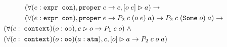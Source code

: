 \begin{figure}
\begin{align*}
& \qquad\quad (\forall (e : \sltm{expr con}), \hybridtm{proper} \; e \rightarrow \bchsl[c]{o \; e}{a}) \rightarrow \\
& \qquad\quad (\forall (e : \sltm{expr con}), \hybridtm{proper} \; e \rightarrow P_2 \; c \; (o \; e) \; a) \rightarrow P_2 \; c \; (\sltm{Some} \; o) \; a) \rightarrow \\
&(\forall (c : \; \sltm{context}) (o : \sltm{oo}), \seqsl[c]{o} \rightarrow P_1 \; c \; o) \; \wedge \\
& (\forall (c : \; \sltm{context}) (o : \sltm{oo}) (a : \sltm{atm}), \bchsl[c]{o}{a} \rightarrow P_2 \; c \; o \; a)
\end{align*}
\vspace{-20pt}
\end{figure}


